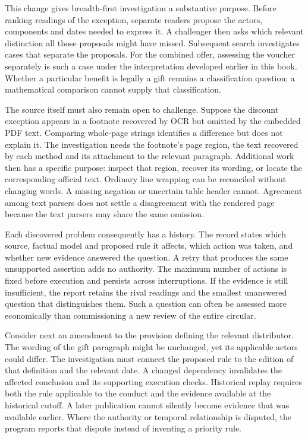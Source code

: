 \documentclass[12pt,a4paper,oneside,openany]{book}
\begin{document}
This change gives breadth-first investigation a substantive purpose. Before
ranking readings of the exception, separate readers propose the actors,
components and dates needed to express it. A challenger then asks which relevant
distinction all those proposals might have missed. Subsequent search investigates
cases that separate the proposals. For the combined offer, assessing the voucher
separately is such a case under the interpretation developed earlier in this
book. Whether a particular benefit is legally a gift remains a classification
question; a mathematical comparison cannot supply that classification.

The source itself must also remain open to challenge. Suppose the discount
exception appears in a footnote recovered by OCR but omitted by the embedded
PDF text. Comparing whole-page strings identifies a difference but does not
explain it. The investigation needs the footnote's page region, the text recovered
by each method and its attachment to the relevant paragraph. Additional work
then has a specific purpose: inspect that region, recover its wording, or locate
the corresponding official text. Ordinary line wrapping can be reconciled
without changing words. A missing negation or uncertain table header cannot.
Agreement among text parsers does not settle a disagreement with the rendered
page because the text parsers may share the same omission.

Each discovered problem consequently has a history. The record states which
source, factual model and proposed rule it affects, which action was taken,
and whether new evidence answered the question. A retry that produces the same
unsupported assertion adds no authority. The maximum number of actions is fixed
before execution and persists across interruptions. If the evidence is still
insufficient, the report retains the rival readings and the smallest unanswered
question that distinguishes them. Such a question can often be assessed more
economically than commissioning a new review of the entire circular.

Consider next an amendment to the provision defining the relevant distributor.
The wording of the gift paragraph might be unchanged, yet its applicable actors
could differ. The investigation must connect the proposed rule to the edition
of that definition and the relevant date. A changed dependency invalidates the
affected conclusion and its supporting execution checks. Historical replay
requires both the rule applicable to the conduct and the evidence available at
the historical cutoff. A later publication cannot silently become evidence that
was available earlier. Where the authority or temporal relationship is disputed,
the program reports that dispute instead of inventing a priority rule.
\end{document}
